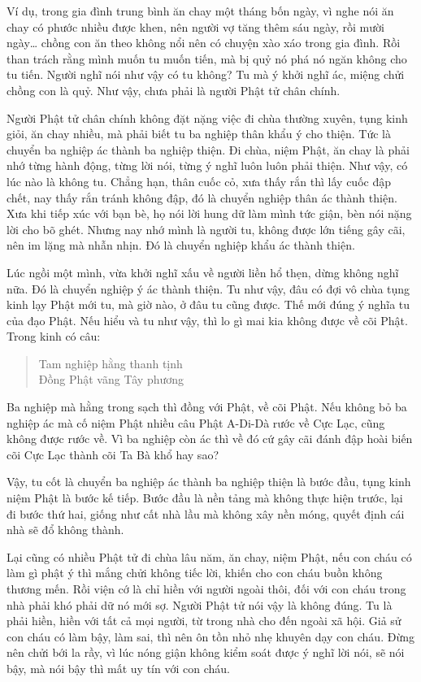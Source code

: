 \documentclass[
  12pt,
  oneside]{book}
\begin{document}
Ví dụ, trong gia đình trung bình ăn chay một tháng bốn ngày, vì nghe nói ăn chay có phước nhiều được khen, nên người vợ tăng thêm sáu ngày, rồi mười ngày\ldots{} chồng con ăn theo không nổi nên có chuyện xào xáo trong gia đình. Rồi than trách rằng mình muốn tu muốn tiến, mà bị quỷ nó phá nó ngăn không cho tu tiến. Người nghĩ nói như vậy có tu không? Tu mà ý khởi nghĩ ác, miệng chửi chồng con là quỷ. Như vậy, chưa phải là người Phật tử chân chính.

Người Phật tử chân chính không đặt nặng việc đi chùa thường xuyên, tụng kinh giỏi, ăn chay nhiều, mà phải biết tu ba nghiệp thân khẩu ý cho thiện. Tức là chuyển ba nghiệp ác thành ba nghiệp thiện. Đi chùa, niệm Phật, ăn chay là phải nhớ từng hành động, từng lời nói, từng ý nghĩ luôn luôn phải thiện. Như vậy, có lúc nào là không tu. Chẳng hạn, thân cuốc cỏ, xưa thấy rắn thì lấy cuốc đập chết, nay thấy rắn tránh không đập, đó là chuyển nghiệp thân ác thành thiện. Xưa khi tiếp xúc với bạn bè, họ nói lời hung dữ làm mình tức giận, bèn nói nặng lời cho bõ ghét. Nhưng nay nhớ mình là người tu, không được lớn tiếng gây cãi, nên im lặng mà nhẫn nhịn. Đó là chuyển nghiệp khẩu ác thành thiện.

Lúc ngồi một mình, vừa khởi nghĩ xấu về người liền hổ thẹn, dừng không nghĩ nữa. Đó là chuyển nghiệp ý ác thành thiện. Tu như vậy, đâu có đợi vô chùa tụng kinh lạy Phật mới tu, mà giờ nào, ở đâu tu cũng được. Thế mới đúng ý nghĩa tu của đạo Phật. Nếu hiểu và tu như vậy, thì lo gì mai kia không được về cõi Phật. Trong kinh có câu:

\begin{quote}
Tam nghiệp hằng thanh tịnh\\
Đồng Phật vãng Tây phương
\end{quote}

Ba nghiệp mà hằng trong sạch thì đồng với Phật, về cõi Phật. Nếu không bỏ ba nghiệp ác mà cố niệm Phật nhiều câu Phật A-Di-Dà rước về Cực Lạc, cũng không được rước về. Vì ba nghiệp còn ác thì về đó cứ gây cãi đánh đập hoài biến cõi Cực Lạc thành cõi Ta Bà khổ hay sao?

Vậy, tu cốt là chuyển ba nghiệp ác thành ba nghiệp thiện là bước đầu, tụng kinh niệm Phật là bước kế tiếp. Bước đầu là nền tảng mà không thực hiện trước, lại đi bước thứ hai, giống như cất nhà lầu mà không xây nền móng, quyết định cái nhà sẽ đổ không thành.

Lại cũng có nhiều Phật tử đi chùa lâu năm, ăn chay, niệm Phật, nếu con cháu có làm gì phật ý thì mắng chửi không tiếc lời, khiến cho con cháu buồn không thương mến. Rồi viện cớ là chỉ hiền với người ngoài thôi, đối với con cháu trong nhà phải khó phải dữ nó mới sợ. Người Phật tử nói vậy là không đúng. Tu là phải hiền, hiền với tất cả mọi người, từ trong nhà cho đến ngoài xã hội. Giả sử con cháu có làm bậy, làm sai, thì nên ôn tồn nhỏ nhẹ khuyên dạy con cháu. Đừng nên chửi bới la rầy, vì lúc nóng giận không kiểm soát được ý nghĩ lời nói, sẽ nói bậy, mà nói bậy thì mất uy tín với con cháu.
\end{document}
